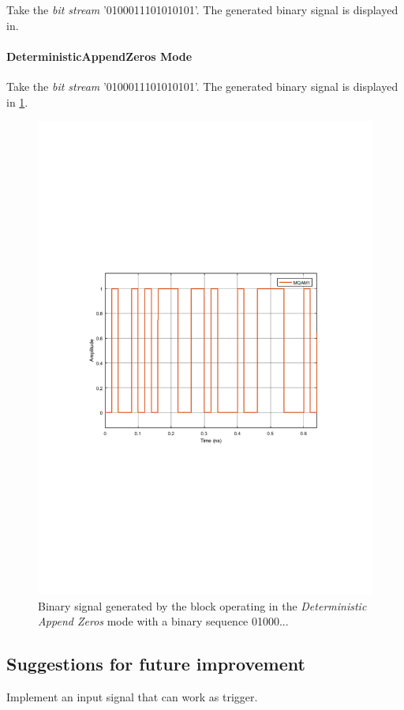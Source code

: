 Take the \textit{bit stream} '0100011101010101'. The generated binary signal is displayed in.

\paragraph*{DeterministicAppendZeros Mode}

Take the \textit{bit stream} '0100011101010101'. The generated binary signal is displayed in \ref{MQAM1_DeterministAppendZeros}.

\begin{figure}
	\centering
	\includegraphics[clip, trim=0.5cm 9cm 0.5cm 9cm, width=\textwidth]{./lib/binary_source/figures/BinarySource_output.pdf}
	
	\caption{Binary signal generated by the block operating in the \textit{Deterministic Append Zeros} mode with a binary sequence 01000...}\label{MQAM1_DeterministAppendZeros}
\end{figure}

\subsection*{Suggestions for future improvement}

Implement an input signal that can work as trigger.

